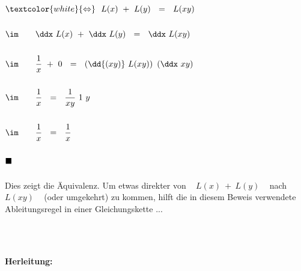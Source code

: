 \begin{description}[leftmargin=*, labelsep=3em, itemsep=3em]
	
	\item[\textnormal{c) \quad i)}] \hfill
	
	~\\
	
	\setcounter{tc}{0}
	
	$\begin{aligned}[t]
	&\textcolor{white}{\Leftrightarrow} ~~ L(x) ~ + ~ L(y) ~~ = ~~ L(xy) \\ \\
	&\im \qquad \ddx ~ L(x) ~ + ~ \ddx ~ L(y) ~~ = ~~ \ddx ~ L(xy) \\ \\
	&\im \qquad \frac{1}{x} ~ + ~ 0 ~~ = ~~ \left( \dd{(xy)} ~ L(xy) \right) ~ \left( \ddx ~ xy \right) \\ \\
	&\im \qquad \frac{1}{x} ~~ = ~~ \frac{1}{xy} ~ 1 ~ y \\ \\
	&\im \qquad \frac{1}{x} ~~ = ~~ \frac{1}{x} \\ \\
	&\blacksquare
	\end{aligned}$ \\
	
	~\\
	
	Dies zeigt die Äquivalenz. Um etwas direkter von ~ $L(x) ~ + ~ L(y)$ ~ nach ~ $L(xy)$ ~ (oder umgekehrt) zu kommen, hilft die in diesem Beweis verwendete Ableitungsregel in einer Gleichungskette ...
	
	~\\
	~\\
	
	\newpage
	
	\textbf{Herleitung:}
	
	~\\
	

\end{description}
